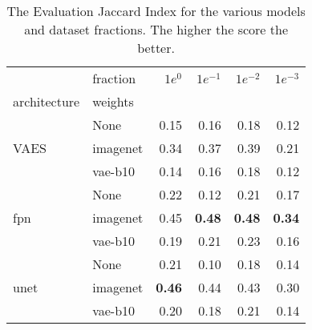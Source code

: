 \begin{table}[ht]
\centering
\caption{The Evaluation Jaccard Index for the various models and dataset fractions. The higher the score the better.}
\label{tab:data_fraction_results}
\begin{tabular}{llrrrr}
\toprule
 & fraction & $1e^{0}$ & $1e^{-1}$ & $1e^{-2}$ & $1e^{-3}$ \\
architecture & weights &  &  &  &  \\
\midrule
\multirow[c]{3}{*}{VAES} & None & 0.15 & 0.16 & 0.18 & 0.12 \\
 & imagenet & 0.34 & 0.37 & 0.39 & 0.21 \\
 & vae-b10 & 0.14 & 0.16 & 0.18 & 0.12 \\
\multirow[c]{3}{*}{fpn} & None & 0.22 & 0.12 & 0.21 & 0.17 \\
 & imagenet & 0.45 & \textbf{0.48} & \textbf{0.48} & \textbf{0.34} \\
 & vae-b10 & 0.19 & 0.21 & 0.23 & 0.16 \\
\multirow[c]{3}{*}{unet} & None & 0.21 & 0.10 & 0.18 & 0.14 \\
 & imagenet & \textbf{0.46} & 0.44 & 0.43 & 0.30 \\
 & vae-b10 & 0.20 & 0.18 & 0.21 & 0.14 \\
\bottomrule
\end{tabular}
\end{table}
